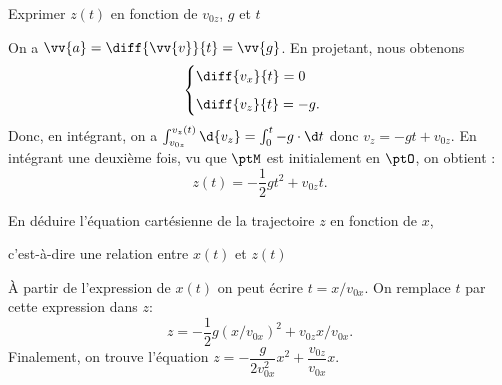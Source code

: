 


\begin{enonce}
	Exprimer $z(t)$ en fonction de $v_{0z}$, $g$ et $t$
\end{enonce}

	
\begin{corrige}
 On a $\vv{a} = 
	\diff{\vv{v}}{t} = \vv{g}$.
	En projetant, nous obtenons 
	\[
	\begin{cases}
		\diff{v_x}{t} = 0\\[2mm]
		\diff{v_z}{t} = -g.
	\end{cases}
	\]
Donc, en intégrant,  on a $\int^{v_z(t)}_{v_{0z}}\d{v_z}=\int^t_0 -g \cdot \d t$ donc $v_z=-gt+v_{0z}$.
En intégrant une deuxième fois,  vu que $\ptM$ 
est initialement en $\ptO$, on obtient : 
\[
	z(t) = -\dfrac{1}{2}gt^2 + v_{0z}t.
\]
\end{corrige}




\smallskip

\begin{enonce}
	En déduire l'équation cartésienne de la trajectoire $z$ en fonction de $x$, \minusBigskip
	\par c'est-à-dire une relation entre $x(t)$ et $z(t)$
\end{enonce}


\begin{corrige}
À partir de l'expression de $x(t)$ on peut écrire $t=x/v_{0x}$. On remplace $t$ par cette expression dans $z$:
\[
z =-\dfrac{1}{2}g(x/v_{0x})^2 + v_{0z} x/v_{0x}.
\]
Finalement, on trouve l'équation $z=-\dfrac{g}{2v_{0x}^2}x^2+\dfrac{v_{0z}}{v_{0x}}x$.
\end{corrige}


\finEntrainement



